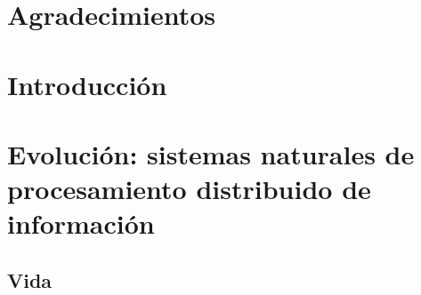 \documentclass[a4paper,10pt]{book}
\makeatletter
\renewcommand{\mainmatter}{\cleardoublepage\@mainmattertrue}
\theoremstyle{definition}1
\newif\ifen
\newif\ifes
\newcommand{\en}[1]{\ifen#1\fi}
\newcommand{\es}[1]{\ifes#1\fi}
\makeatother
\begin{document}

\chapter{Agradecimientos}

\chapter{Introducción}

\mainmatter



\chapter{Evolución: sistemas naturales de procesamiento distribuido de información} \label{ch:evo}


\section{Vida}

\en{In the last third of the history of the Universe, sometime around 4 billion years ago, a simple form of matter organization capable of self-replication appeared on Earth. }%
\es{En el último tercio de la historia del Universo, en algún momento hace aproximadamente 4000 millones de años, apareció en la tierra una forma de organización de la materia capaz de auto-replicarse. }%
%
\en{The growth of these lineages followed multiplicative and noisy processes: sequences of survival and reproduction rates. }%
\es{El crecimiento de estos linajes siguieron procesos multiplicativos y ruidosos: secuencias de tasas de supervivencia y reproducción. }%
%
\en{The errors produced during replication diversified the life forms, and the growth rates of the different strategies favored those better adapted to the environment. }%
\es{Los errores producidos durante la replicación diversificaron las formas de vida, y las diferentes tasas de crecimiento favorecieron a aquellas estrategias mejor adaptadas al ambiente. }%
%
\en{The current complexity of life is the consequence of a series of evolutionary transitions in which entities capable of self-replication after the transition become part of higher level cooperative units~\cite{maynardSmith1995-majorTransitions, szathmary1995-evolutionaryTransitions, szathmary2015-evolutionaryTransitions}. }%
\es{La complejidad actual de la vida es consecuencia de una serie de transiciones evolutivas en las que entidades capaces de autoreplicación luego de la transición pasan a formar parte de unidades cooperativas de nivel superior~\cite{maynardSmith1995-majorTransitions, szathmary1995-evolutionaryTransitions, szathmary2015-evolutionaryTransitions}. }%
\end{document}
